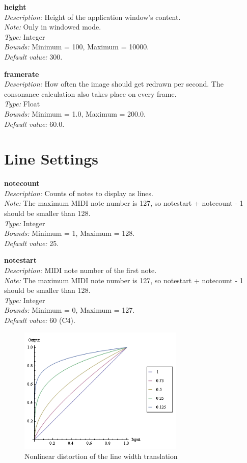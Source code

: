 \documentclass[12pt,a4paper,titlepage,oneside]{report}
\begin{document}
\noindent
\textbf{height} \\
\textit{Description:} Height of the application window's content. \\
\textit{Note:} Only in windowed mode. \\
\textit{Type:} Integer \\
\textit{Bounds:} Minimum = 100, Maximum = 10000. \\
\textit{Default value:} 300.

\noindent
\textbf{framerate} \\
\textit{Description:} How often the image should get redrawn per second. The consonance calculation also takes place on every frame. \\
\textit{Type:} Float \\
\textit{Bounds:} Minimum = 1.0, Maximum = 200.0. \\
\textit{Default value:} 60.0.


\section{Line Settings}

\noindent
\textbf{notecount} \\
\textit{Description:} Counts of notes to display as lines. \\
\textit{Note:} The maximum MIDI note number is 127, so notestart + notecount - 1 should be smaller than 128. \\
\textit{Type:} Integer \\
\textit{Bounds:} Minimum = 1, Maximum = 128. \\
\textit{Default value:} 25.

\noindent
\textbf{notestart} \\
\textit{Description:} MIDI note number of the first note. \\
\textit{Note:} The maximum MIDI note number is 127, so notestart + notecount - 1 should be smaller than 128. \\
\textit{Type:} Integer \\
\textit{Bounds:} Minimum = 0, Maximum = 127. \\
\textit{Default value:} 60 (C4).

\begin{figure}[!ht]
\includegraphics[width=0.7\textwidth]{images/linebend.png}
\centering
\caption{Nonlinear distortion of the line width translation}
\label{fig:linebend}
\end{figure}
\end{document}
